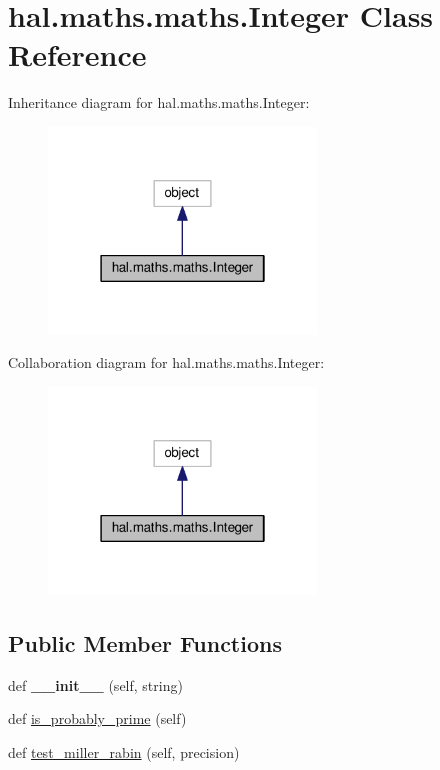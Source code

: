\hypertarget{classhal_1_1maths_1_1maths_1_1_integer}{}\section{hal.\+maths.\+maths.\+Integer Class Reference}
\label{classhal_1_1maths_1_1maths_1_1_integer}


Inheritance diagram for hal.\+maths.\+maths.\+Integer\+:
\nopagebreak
\begin{figure}[H]
\begin{center}
\leavevmode
\includegraphics[width=202pt]{classhal_1_1maths_1_1maths_1_1_integer__inherit__graph}
\end{center}
\end{figure}


Collaboration diagram for hal.\+maths.\+maths.\+Integer\+:
\nopagebreak
\begin{figure}[H]
\begin{center}
\leavevmode
\includegraphics[width=202pt]{classhal_1_1maths_1_1maths_1_1_integer__coll__graph}
\end{center}
\end{figure}
\subsection*{Public Member Functions}
\begin{DoxyCompactItemize}
\item 
def {\bfseries \+\_\+\+\_\+init\+\_\+\+\_\+} (self, string)\hypertarget{classhal_1_1maths_1_1maths_1_1_integer_ab02daf8f7df66b9739514805740d2e29}{}\label{classhal_1_1maths_1_1maths_1_1_integer_ab02daf8f7df66b9739514805740d2e29}

\item 
def \hyperlink{classhal_1_1maths_1_1maths_1_1_integer_a813e392f81a6c01f87a9ef8d1c8c1250}{is\+\_\+probably\+\_\+prime} (self)
\item 
def \hyperlink{classhal_1_1maths_1_1maths_1_1_integer_a3cd7d69cc1e8bb8271e61bbeba6d2a50}{test\+\_\+miller\+\_\+rabin} (self, precision)
\end{DoxyCompactItemize}
